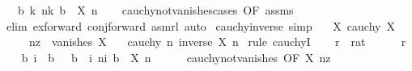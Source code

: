 \begin{isabellebody}
\ \ \ {\isachardoublequoteopen}{\isasymexists}b{\isachargreater}{\kern0pt}{}{\isachardot}{\kern0pt}\ {\isasymexists}k{\isachardot}{\kern0pt}\ {\isasymforall}n{\isasymge}k{\isachardot}{\kern0pt}\ b\ {\isacharless}{\kern0pt}\ {\isasymbar}X\ n{\isasymbar}{\isachardoublequoteclose}\isanewline
%
\isadelimproof
\ \ %
\endisadelimproof
%
\isatagproof
{}\isamarkupfalse%
\ cauchy{\isacharunderscore}{\kern0pt}not{\isacharunderscore}{\kern0pt}vanishes{\isacharunderscore}{\kern0pt}cases\ {\isacharbrackleft}{\kern0pt}OF\ assms{\isacharbrackright}{\kern0pt}\isanewline
\ \ \isamarkupfalse%
\ {\isacharparenleft}{\kern0pt}elim\ ex{\isacharunderscore}{\kern0pt}forward\ conj{\isacharunderscore}{\kern0pt}forward\ asm{\isacharunderscore}{\kern0pt}rl{\isacharparenright}{\kern0pt}\ auto%
\endisatagproof
{\isafoldproof}%
%
\isadelimproof
\isanewline
%
\endisadelimproof
\isanewline
{}\isamarkupfalse%
\ cauchy{\isacharunderscore}{\kern0pt}inverse\ {\isacharbrackleft}{\kern0pt}simp{\isacharbrackright}{\kern0pt}{\isacharcolon}{\kern0pt}\isanewline
\ \ \ X{\isacharcolon}{\kern0pt}\ {\isachardoublequoteopen}cauchy\ X{\isachardoublequoteclose}\isanewline
\ \ \ \ \ nz{\isacharcolon}{\kern0pt}\ {\isachardoublequoteopen}{\isasymnot}\ vanishes\ X{\isachardoublequoteclose}\isanewline
\ \ \ {\isachardoublequoteopen}cauchy\ {\isacharparenleft}{\kern0pt}{\isasymlambda}n{\isachardot}{\kern0pt}\ inverse\ {\isacharparenleft}{\kern0pt}X\ n{\isacharparenright}{\kern0pt}{\isacharparenright}{\kern0pt}{\isachardoublequoteclose}\isanewline
%
\isadelimproof
%
\endisadelimproof
%
\isatagproof
{}\isamarkupfalse%
\ {\isacharparenleft}{\kern0pt}rule\ cauchyI{\isacharparenright}{\kern0pt}\isanewline
\ \ \isamarkupfalse%
\ r\ {\isacharcolon}{\kern0pt}{\isacharcolon}{\kern0pt}\ rat\isanewline
\ \ \isamarkupfalse%
\ {\isachardoublequoteopen}{}\ {\isacharless}{\kern0pt}\ r{\isachardoublequoteclose}\isanewline
\ \ \isamarkupfalse%
\ b\ i\ \ b{\isacharcolon}{\kern0pt}\ {\isachardoublequoteopen}{}\ {\isacharless}{\kern0pt}\ b{\isachardoublequoteclose}\ \ i{\isacharcolon}{\kern0pt}\ {\isachardoublequoteopen}{\isasymforall}n{\isasymge}i{\isachardot}{\kern0pt}\ b\ {\isacharless}{\kern0pt}\ {\isasymbar}X\ n{\isasymbar}{\isachardoublequoteclose}\isanewline
\ \ \ \ \isamarkupfalse%
\ cauchy{\isacharunderscore}{\kern0pt}not{\isacharunderscore}{\kern0pt}vanishes\ {\isacharbrackleft}{\kern0pt}OF\ X\ nz{\isacharbrackright}{\kern0pt}\ \isamarkupfalse%

\end{isabellebody}
